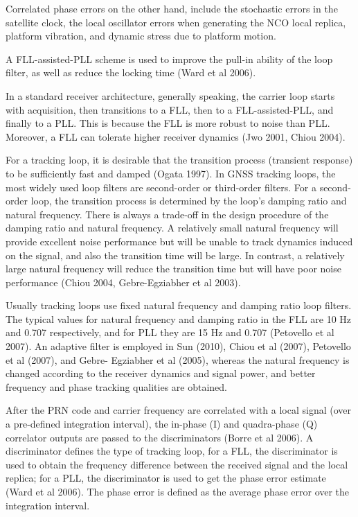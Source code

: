 Correlated phase errors on the other hand, include the stochastic errors in the satellite clock, the local oscillator errors when generating the NCO local replica, platform vibration, and dynamic stress due to platform motion.


A FLL-assisted-PLL scheme is used to improve the pull-in ability of the loop filter, as well as reduce the locking time (Ward et al 2006).

In a standard receiver architecture, generally speaking, the carrier loop starts with acquisition, then transitions to a FLL, then to a FLL-assisted-PLL, and finally to a PLL. This is because the FLL is more robust to noise than PLL. Moreover, a FLL
can tolerate higher receiver dynamics (Jwo 2001, Chiou 2004).


For a tracking loop, it is desirable that the transition process (transient response) to be sufficiently fast and damped (Ogata 1997). In GNSS tracking loops, the most widely used loop filters are second-order or third-order filters. For a second-order loop, the transition process is determined by the loop's damping ratio and natural frequency. There is always a trade-off in the design procedure of the damping ratio and natural frequency. A relatively small natural frequency will provide excellent noise performance but will be unable to track dynamics induced on the signal, and also the transition time will be large. In contrast, a relatively large natural frequency will reduce the transition time but will have poor noise performance (Chiou 2004, Gebre-Egziabher et al 2003).



Usually tracking loops use fixed natural frequency and damping ratio loop filters. The typical values for natural frequency and damping ratio in the FLL are 10 Hz and 0.707 respectively, and for PLL they are 15 Hz and 0.707 (Petovello et al 2007). An adaptive filter is employed in Sun (2010), Chiou et al (2007), Petovello et al (2007), and Gebre- Egziabher et al (2005), whereas the natural frequency is changed according to the receiver dynamics and signal power, and better frequency and phase tracking qualities are obtained.


After the PRN code and carrier frequency are correlated with a local signal (over a pre-defined integration interval), the in-phase (I) and quadra-phase (Q) correlator outputs are passed to the discriminators (Borre et al 2006). A discriminator defines the type of tracking loop, for a FLL, the discriminator is used to obtain the frequency difference between the received signal and the local replica; for a PLL, the discriminator is used to get the phase error estimate (Ward et al 2006). The phase error is defined as the average phase error over the integration interval.

